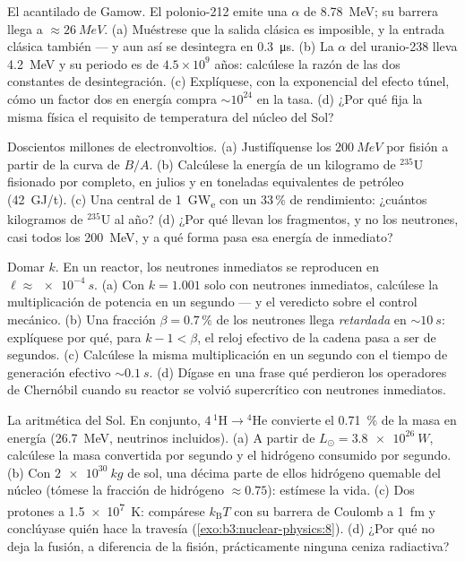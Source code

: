 \begin{exercise}[$\star\star$]\label{exo:b3:nuclear-physics:8}
El acantilado de Gamow. El polonio-212 emite una $\alpha$ de \qty{8.78}{MeV};
su barrera llega a $\approx\qty{26}{MeV}$. (a) Muéstrese que la salida clásica
es imposible, y la entrada clásica también --- y aun así se desintegra
en \qty{0.3}{\micro s}. (b) La $\alpha$ del uranio-238 lleva
\qty{4.2}{MeV} y su periodo es de $4.5\times10^9$ años:
calcúlese la razón de las dos constantes de desintegración. (c) Explíquese, con
la exponencial del efecto túnel, cómo un factor dos en energía compra
$\sim10^{24}$ en la tasa. (d) ¿Por qué fija la misma física el requisito de
temperatura del núcleo del Sol?
\end{exercise}

\begin{exercise}[$\star\star$]\label{exo:b3:nuclear-physics:9}
Doscientos millones de electronvoltios. (a) Justifíquense los
$\qty{200}{MeV}$ por fisión a partir de la curva de $B/A$. (b) Calcúlese
la energía de un kilogramo de $^{235}$U fisionado por completo, en
julios y en toneladas equivalentes de petróleo
(\qty{42}{GJ/t}). (c) Una central de \qty{1}{GW_e} con un 33\,\%
de rendimiento: ¿cuántos kilogramos de $^{235}$U al año? (d) ¿Por qué
llevan los fragmentos, y no los neutrones, casi todos los
\qty{200}{MeV}, y a qué forma pasa esa energía de inmediato?
\end{exercise}

\begin{exercise}[$\star\star\star$]\label{exo:b3:nuclear-physics:10}
Domar $k$. En un reactor, los neutrones inmediatos se reproducen en $\ell
\approx \qty{e-4}{s}$. (a) Con $k = 1.001$ solo con neutrones
inmediatos, calcúlese la multiplicación de potencia en un segundo --- y el
veredicto sobre el control mecánico. (b) Una fracción $\beta =
0.7\,\%$ de los neutrones llega \emph{retardada} en $\sim\qty{10}{s}$:
explíquese por qué, para $k - 1 < \beta$, el reloj efectivo de la cadena
pasa a ser de segundos. (c) Calcúlese la misma multiplicación en un segundo
con el tiempo de generación efectivo $\sim\qty{0.1}{s}$. (d) Dígase
en una frase qué perdieron los operadores de Chernóbil cuando su
reactor se volvió supercrítico con neutrones inmediatos.
\end{exercise}

\begin{exercise}[$\star\star\star$]\label{exo:b3:nuclear-physics:11}
La aritmética del Sol. En conjunto, $4\,^1\text{H} \to {}^4\text{He}$
convierte el \qty{0.71}{\percent} de la masa en energía
(\qty{26.7}{MeV}, neutrinos incluidos). (a) A partir de $L_\odot =
\qty{3.8e26}{W}$, calcúlese la masa convertida por segundo y el
hidrógeno consumido por segundo. (b) Con $\qty{2e30}{kg}$ de sol,
una décima parte de ellos hidrógeno quemable del núcleo (tómese la fracción de hidrógeno
$\approx0.75$): estímese la vida. (c) Dos protones a
\qty{1.5e7}{K}: compárese $k_{\text{B}}T$ con su barrera de Coulomb
a \qty{1}{fm} y conclúyase quién hace la travesía
(\cref{exo:b3:nuclear-physics:8}). (d) ¿Por qué no deja la fusión, a diferencia de la
fisión, prácticamente ninguna ceniza radiactiva?
\end{exercise}

